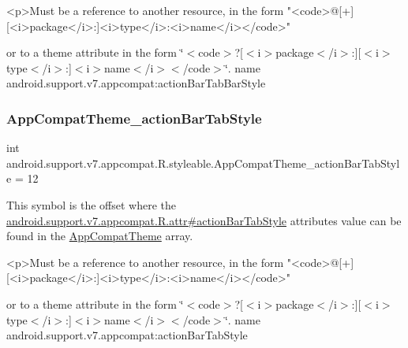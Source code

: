 \begin{DoxyVerb}      <p>Must be a reference to another resource, in the form "<code>@[+][<i>package</i>:]<i>type</i>:<i>name</i></code>"
\end{DoxyVerb}
 or to a theme attribute in the form \char`\"{}$<$code$>$?\mbox{[}$<$i$>$package$<$/i$>$\+:\mbox{]}\mbox{[}$<$i$>$type$<$/i$>$\+:\mbox{]}$<$i$>$name$<$/i$>$$<$/code$>$\char`\"{}.  name android.\+support.\+v7.\+appcompat\+:action\+Bar\+Tab\+Bar\+Style \mbox{\label{classandroid_1_1support_1_1v7_1_1appcompat_1_1R_1_1styleable_a2c4b1233d1cce4f6c18fc9982808d74f}} 
\subsubsection{\texorpdfstring{App\+Compat\+Theme\+\_\+action\+Bar\+Tab\+Style}{AppCompatTheme\_actionBarTabStyle}}
{\footnotesize\ttfamily int android.\+support.\+v7.\+appcompat.\+R.\+styleable.\+App\+Compat\+Theme\+\_\+action\+Bar\+Tab\+Style = 12\hspace{0.3cm}{\ttfamily [static]}}

This symbol is the offset where the \hyperlink{classandroid_1_1support_1_1v7_1_1appcompat_1_1R_1_1attr_ac8dabb7ecb7995fda674a5ecc8eca50d}{android.\+support.\+v7.\+appcompat.\+R.\+attr\#action\+Bar\+Tab\+Style} attribute\textquotesingle{}s value can be found in the \hyperlink{classandroid_1_1support_1_1v7_1_1appcompat_1_1R_1_1styleable_a5c42f89e8a410c323be34208d75c430b}{App\+Compat\+Theme} array.

\begin{DoxyVerb}      <p>Must be a reference to another resource, in the form "<code>@[+][<i>package</i>:]<i>type</i>:<i>name</i></code>"
\end{DoxyVerb}
 or to a theme attribute in the form \char`\"{}$<$code$>$?\mbox{[}$<$i$>$package$<$/i$>$\+:\mbox{]}\mbox{[}$<$i$>$type$<$/i$>$\+:\mbox{]}$<$i$>$name$<$/i$>$$<$/code$>$\char`\"{}.  name android.\+support.\+v7.\+appcompat\+:action\+Bar\+Tab\+Style \mbox{\label{classandroid_1_1support_1_1v7_1_1appcompat_1_1R_1_1styleable_a82190f5955d5a7de45c6d9213d167e18}} 
